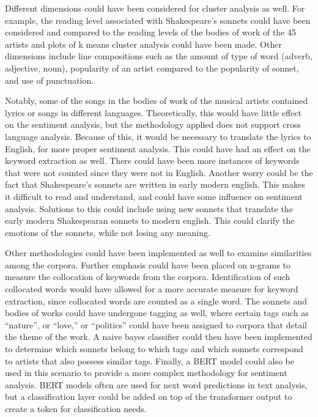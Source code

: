 \documentclass[10pt,a4paper]{article}
\begin{document}
\noindent Different dimensions could have been considered for cluster analysis as well. For example, the reading level associated with Shakespeare’s sonnets could have been considered and compared to the reading levels of the bodies of work of the 45 artists and plots of k means cluster analysis could have been made. Other dimensions include line compositions such as the amount of type of word (adverb, adjective, noun), popularity of an artist compared to the popularity of sonnet, and use of punctuation. 

\noindent Notably, some of the songs in the bodies of work of the musical artists contained lyrics or songs in different languages. Theoretically, this would have little effect on the sentiment analysis, but the methodology applied does not support cross language analysis. Because of this, it would be necessary to translate the lyrics to English, for more proper sentiment analysis. This could have had an effect on the keyword extraction as well. There could have been more instances of keywords that were not counted since they were not in English. Another worry could be the fact that Shakespeare’s sonnets are written in early modern english. This makes it difficult to read and understand, and could have some influence on sentiment analysis. Solutions to this could include using new sonnets that translate the early modern Shakespearan sonnets to modern english. This could clarify the emotions of the sonnets, while not losing any meaning. 

\noindent Other methodologies could have been implemented as well to examine similarities among the corpora. Further emphasis could have been placed on n-grams to measure the collocation of keywords from the corpora. Identification of such collocated words would have allowed for a more accurate measure for keyword extraction, since collocated words are counted as a single word. The sonnets and bodies of works could have undergone tagging as well, where certain tags such as “nature”, or “love,” or “politics” could have been assigned to corpora that detail the theme of the work. A naive bayes classifier could then have been implemented to determine which sonnets belong to which tags and which sonnets correspond to artists that also possess similar tags. Finally, a BERT model could also be used in this scenario to provide a more complex methodology for sentiment analysis. BERT models often are used for next word predictions in text analysis, but a classification layer could be added on top of the transformer output to create a token for classification needs. 
\end{document}
